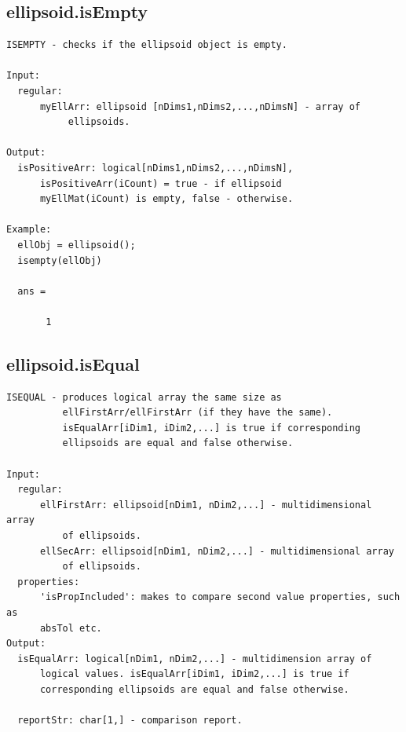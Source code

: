 \documentclass[letterpaper,10pt,english]{sphinxmanual}
\begin{document}
\subsection{ellipsoid.isEmpty}
\label{chap_functions:ellipsoid-isempty}
\begin{Verbatim}[commandchars=\\\{\}]
ISEMPTY - checks if the ellipsoid object is empty.

Input:
  regular:
      myEllArr: ellipsoid [nDims1,nDims2,...,nDimsN] - array of
           ellipsoids.

Output:
  isPositiveArr: logical[nDims1,nDims2,...,nDimsN],
      isPositiveArr(iCount) = true - if ellipsoid
      myEllMat(iCount) is empty, false - otherwise.

Example:
  ellObj = ellipsoid();
  isempty(ellObj)

  ans =

       1
\end{Verbatim}


\subsection{ellipsoid.isEqual}
\label{chap_functions:ellipsoid-isequal}
\begin{Verbatim}[commandchars=\\\{\}]
ISEQUAL - produces logical array the same size as
          ellFirstArr/ellFirstArr (if they have the same).
          isEqualArr[iDim1, iDim2,...] is true if corresponding
          ellipsoids are equal and false otherwise.

Input:
  regular:
      ellFirstArr: ellipsoid[nDim1, nDim2,...] - multidimensional array
          of ellipsoids.
      ellSecArr: ellipsoid[nDim1, nDim2,...] - multidimensional array
          of ellipsoids.
  properties:
      'isPropIncluded': makes to compare second value properties, such as
      absTol etc.
Output:
  isEqualArr: logical[nDim1, nDim2,...] - multidimension array of
      logical values. isEqualArr[iDim1, iDim2,...] is true if
      corresponding ellipsoids are equal and false otherwise.

  reportStr: char[1,] - comparison report.
\end{Verbatim}
\end{document}
